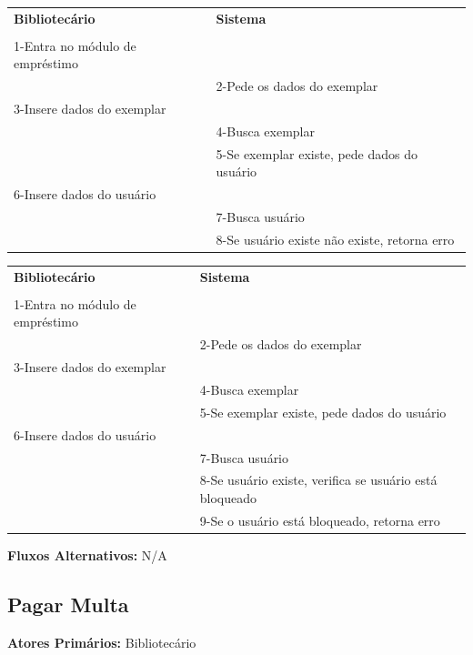 \documentclass[
	12pt,				%
	openright,			%
	oneside,			%
	a4paper,			%
	english,			%
	brazil				%
	]{abntex2}
\begin{document}
\begin{table}[H]
\ABNTEXfontereduzida
\begin{center}
\begin{tabular}{p{5.5cm} p{5.5cm}}
    \textbf{Bibliotecário} & \textbf{Sistema}\\
     & \\
    1-Entra no módulo de empréstimo & \\
     & 2-Pede os dados do exemplar\\
    3-Insere dados do exemplar & \\
     & 4-Busca exemplar\\
     & 5-Se exemplar existe, pede dados do usuário\\
    6-Insere dados do usuário & \\
     & 7-Busca usuário\\
     & 8-Se usuário existe não existe, retorna erro\\
\end{tabular}
\end{center}
\end{table} 

\begin{table}[H]
\ABNTEXfontereduzida
\begin{center}
\begin{tabular}{p{5.5cm} p{5.5cm}}
    \textbf{Bibliotecário} & \textbf{Sistema}\\
     & \\
    1-Entra no módulo de empréstimo & \\
     & 2-Pede os dados do exemplar\\
    3-Insere dados do exemplar & \\
     & 4-Busca exemplar\\
     & 5-Se exemplar existe, pede dados do usuário\\
    6-Insere dados do usuário & \\
     & 7-Busca usuário\\
     & 8-Se usuário existe, verifica se usuário está bloqueado\\
     & 9-Se o usuário está bloqueado, retorna erro\\
\end{tabular}
\end{center}
\end{table} 
                                                                
\textbf{Fluxos Alternativos:} N/A

\subsection{Pagar Multa}
\textbf{Atores Primários:} Bibliotecário
\end{document}
